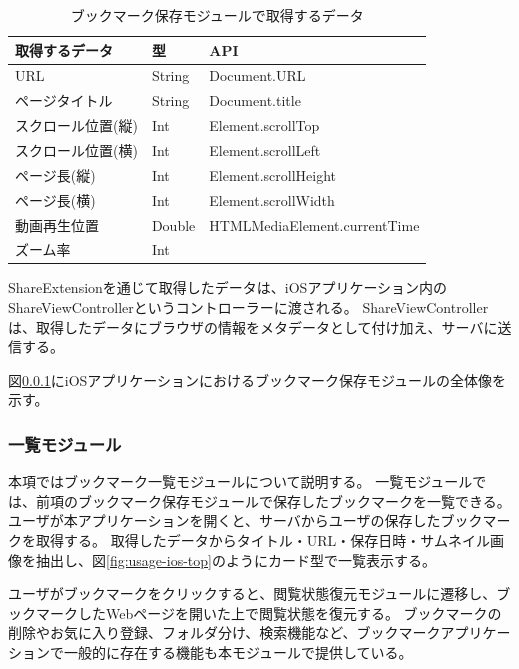 \begin{table}[htbp]
  \label{tb:impl-ios-data-js-api}
  \caption{ブックマーク保存モジュールで取得するデータ}
  \begin{center}
    \begin{tabular}{|l|l|l|}
    \hline
    取得するデータ & 型 & API \\ \hline
    URL & String & Document.URL \\ \hline
    ページタイトル & String & Document.title \\ \hline
    スクロール位置(縦) & Int & Element.scrollTop \\ \hline
    スクロール位置(横) & Int & Element.scrollLeft \\ \hline
    ページ長(縦) & Int & Element.scrollHeight \\ \hline
    ページ長(横) & Int & Element.scrollWidth \\ \hline
    動画再生位置 & Double & HTMLMediaElement.currentTime \\ \hline
    ズーム率 & Int &  \\ \hline
    \end{tabular}
  \end{center}
\end{table}

ShareExtensionを通じて取得したデータは、iOSアプリケーション内のShareViewControllerというコントローラーに渡される。
ShareViewControllerは、取得したデータにブラウザの情報をメタデータとして付け加え、サーバに送信する。

図\ref{}にiOSアプリケーションにおけるブックマーク保存モジュールの全体像を示す。

\subsubsection{一覧モジュール}
本項ではブックマーク一覧モジュールについて説明する。
一覧モジュールでは、前項のブックマーク保存モジュールで保存したブックマークを一覧できる。
ユーザが本アプリケーションを開くと、サーバからユーザの保存したブックマークを取得する。
取得したデータからタイトル・URL・保存日時・サムネイル画像を抽出し、図\ref{fig:usage-ios-top}のようにカード型で一覧表示する。

ユーザがブックマークをクリックすると、閲覧状態復元モジュールに遷移し、ブックマークしたWebページを開いた上で閲覧状態を復元する。
ブックマークの削除やお気に入り登録、フォルダ分け、検索機能など、ブックマークアプリケーションで一般的に存在する機能も本モジュールで提供している。

